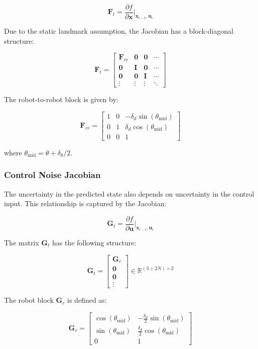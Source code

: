 \documentclass[11pt]{article}
\begin{document}
\[
\mathbf{F}_t =
\frac{\partial f}{\partial \mathbf{x}}
\bigg|_{\mathbf{x}_{t-1}, \mathbf{u}_t}
\]

Due to the static landmark assumption,
the Jacobian has a block-diagonal structure:

\[
\mathbf{F}_t =
\begin{bmatrix}
	\mathbf{F}_{rr} & \mathbf{0} & \mathbf{0} & \cdots \\
	\mathbf{0} & \mathbf{I} & \mathbf{0} & \cdots \\
	\mathbf{0} & \mathbf{0} & \mathbf{I} & \cdots \\
	\vdots & \vdots & \vdots & \ddots
\end{bmatrix}
\]

The robot-to-robot block is given by:

\[
\mathbf{F}_{rr} =
\begin{bmatrix}
	1 & 0 & -\delta_d \sin(\theta_{\text{mid}}) \\
	0 & 1 & \delta_d \cos(\theta_{\text{mid}}) \\
	0 & 0 & 1
\end{bmatrix}
\]

where $\theta_{\text{mid}} = \theta + \delta_\theta/2$.

\subsubsection{Control Noise Jacobian}

The uncertainty in the predicted state
also depends on uncertainty in the control input.
This relationship is captured by the Jacobian:

\[
\mathbf{G}_t =
\frac{\partial f}{\partial \mathbf{u}}
\bigg|_{\mathbf{x}_{t-1}, \mathbf{u}_t}
\]

The matrix $\mathbf{G}_t$ has the following structure:

\[
\mathbf{G}_t =
\begin{bmatrix}
	\mathbf{G}_r \\
	\mathbf{0} \\
	\mathbf{0} \\
	\vdots
\end{bmatrix}
\in \mathbb{R}^{(3+2N)\times 2}
\]

The robot block $\mathbf{G}_r$ is defined as:

\[
\mathbf{G}_r =
\begin{bmatrix}
	\cos(\theta_{\text{mid}}) &
	-\frac{\delta_d}{2}\sin(\theta_{\text{mid}}) \\
	\sin(\theta_{\text{mid}}) &
	\frac{\delta_d}{2}\cos(\theta_{\text{mid}}) \\
	0 & 1
\end{bmatrix}
\]
\end{document}
